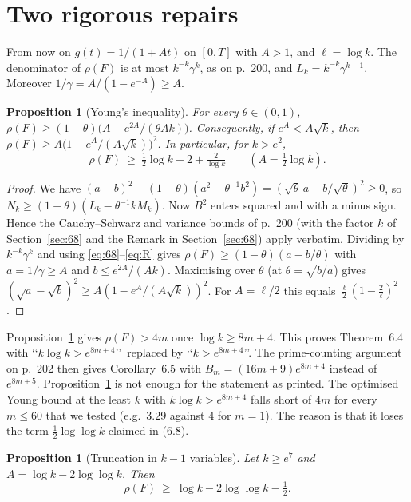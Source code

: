 \documentclass[11pt,a4paper]{amsart}
\newtheorem{proposition}[theorem]{Proposition}
\theoremstyle{remark}
\begin{document}
\section{Two rigorous repairs}\label{sec:repair}

From now on $g(t)=1/(1+At)$ on $[0,T]$ with $A>1$, and $\ell=\log k$. The denominator of $\rho(F)$ is at
most $k^{-k}\gamma^k$, as on p.~200, and $L_k=k^{-k}\gamma^{k-1}$. Moreover
$1/\gamma=A/(1-e^{-A})\ge A$.

\begin{proposition}[Young's inequality]\label{prop:young}
For every $\theta\in(0,1)$, $\rho(F)\ge(1-\theta)\bigl(A-e^{2A}/(\theta Ak)\bigr)$. Consequently, if
$e^A<A\sqrt k$, then $\rho(F)\ge A\bigl(1-e^A/(A\sqrt k)\bigr)^2$. In particular, for $k>e^2$,
\[
\rho(F)\ \ge\ \tfrac12\log k-2+\tfrac{2}{\log k}\qquad(A=\tfrac12\log k).
\]
\end{proposition}

\begin{proof}
We have $(a-b)^2-(1-\theta)(a^2-\theta^{-1}b^2)=(\sqrt\theta\,a-b/\sqrt\theta)^2\ge0$, so
$N_k\ge(1-\theta)(L_k-\theta^{-1}kM_k)$. Now $B^2$ enters squared and with a minus sign. Hence the
Cauchy--Schwarz and variance bounds of p.~200 (with the factor $k$ of Section~\ref{sec:68} and
the Remark in Section~\ref{sec:68}) apply verbatim. Dividing by $k^{-k}\gamma^k$ and using \eqref{eq:68}--\eqref{eq:R}
gives $\rho(F)\ge(1-\theta)(a-b/\theta)$ with $a=1/\gamma\ge A$ and $b\le e^{2A}/(Ak)$. Maximising over
$\theta$ (at $\theta=\sqrt{b/a}$) gives $(\sqrt a-\sqrt b)^2\ge A(1-e^A/(A\sqrt k))^2$. For $A=\ell/2$
this equals $\frac{\ell}2(1-\frac2\ell)^2$.
\end{proof}

Proposition~\ref{prop:young} gives $\rho(F)>4m$ once $\log k\ge8m+4$. This proves Theorem~6.4 with
\lq\lq$k\log k>e^{8m+4}$\rq\rq\ replaced by \lq\lq$k>e^{8m+4}$\rq\rq. The prime-counting argument on
p.~202 then gives Corollary~6.5 with $B_m=(16m+9)e^{8m+4}$ instead of $e^{8m+5}$. Proposition~\ref{prop:young}
is not enough for the statement as printed. The optimised Young bound at the least $k$ with
$k\log k>e^{8m+4}$ falls short of $4m$ for every $m\le60$ that we tested (e.g.\ $3.29$ against $4$ for
$m=1$). The reason is that it loses the term $\frac12\log\log k$ claimed in (6.8).

\begin{proposition}[Truncation in $k-1$ variables]\label{prop:trunc}
Let $k\ge e^{7}$ and $A=\log k-2\log\log k$. Then
\[
\rho(F)\ \ge\ \log k-2\log\log k-\tfrac12 .
\]
\end{proposition}
\end{document}
